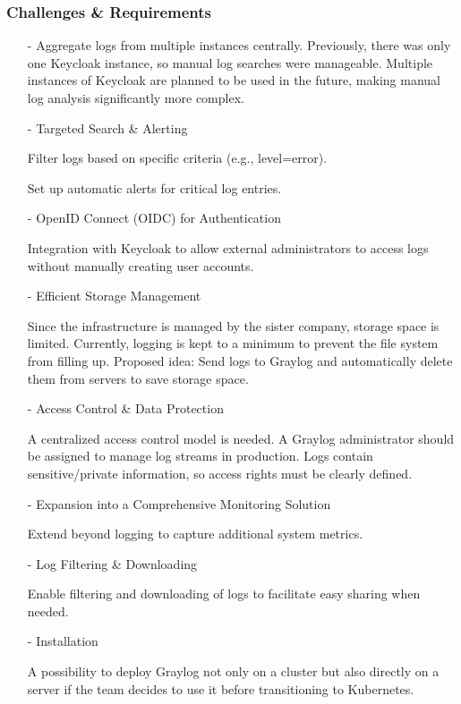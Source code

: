 \documentclass[../main.tex]{subfiles}
\begin{document}
\subsubsection{Challenges \& Requirements}

\begin{enumerate}
    \item[-] Aggregate logs from multiple instances centrally. Previously, there was only one Keycloak instance, so manual log searches were manageable. Multiple instances of Keycloak are planned to be used in the future, making manual log analysis significantly more complex.

    \item[-] Targeted Search \& Alerting
    
    Filter logs based on specific criteria (e.g., level=error).
    
    Set up automatic alerts for critical log entries.

    \item[-] OpenID Connect (OIDC) for Authentication

    Integration with Keycloak to allow external administrators to access logs without manually creating user accounts.

    \item[-] Efficient Storage Management
    
    Since the infrastructure is managed by the sister company, storage space is limited. Currently, logging is kept to a minimum to prevent the file system from filling up. Proposed idea: Send logs to Graylog and automatically delete them from servers to save storage space.

    \item[-] Access Control \& Data Protection

    A centralized access control model is needed. A Graylog administrator should be assigned to manage log streams in production. Logs contain sensitive/private information, so access rights must be clearly defined.

    \item[-] Expansion into a Comprehensive Monitoring Solution

    Extend beyond logging to capture additional system metrics.
    
    \item[-] Log Filtering \& Downloading
    
    Enable filtering and downloading of logs to facilitate easy sharing when needed.

    \item[-] Installation

    A possibility to deploy Graylog not only on a cluster but also directly on a server if the team decides to use it before transitioning to Kubernetes.

\end{enumerate}
\end{document}
